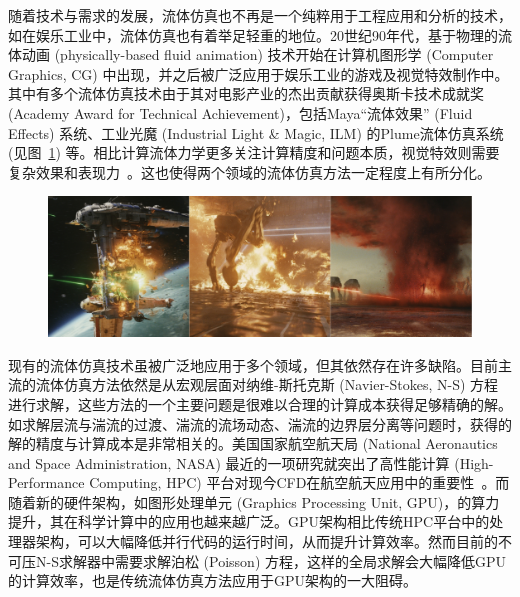 随着技术与需求的发展，流体仿真也不再是一个纯粹用于工程应用和分析的技术，如在娱乐工业中，流体仿真也有着举足轻重的地位。20世纪90年代，基于物理的流体动画 (physically-based fluid animation) 技术开始在计算机图形学 (Computer Graphics, CG) 中出现，并之后被广泛应用于娱乐工业的游戏及视觉特效制作中。其中有多个流体仿真技术由于其对电影产业的杰出贡献获得奥斯卡技术成就奖 (Academy Award for Technical Achievement)，包括Maya“流体效果” (Fluid Effects) 系统、工业光魔 (Industrial Light \& Magic, ILM) 的Plume流体仿真系统 (见图~\ref{img:star_wars}) 等。相比计算流体力学更多关注计算精度和问题本质，视觉特效则需要复杂效果和表现力~\citep{C1}。这也使得两个领域的流体仿真方法一定程度上有所分化。

\begin{figure}[htbp]
  \centering
    \includegraphics[width=0.99\columnwidth]{figures/star_wars.png}
  \label{img:star_wars}
\end{figure}

现有的流体仿真技术虽被广泛地应用于多个领域，但其依然存在许多缺陷。目前主流的流体仿真方法依然是从宏观层面对纳维-斯托克斯 (Navier-Stokes, N-S) 方程进行求解，这些方法的一个主要问题是很难以合理的计算成本获得足够精确的解。如求解层流与湍流的过渡、湍流的流场动态、湍流的边界层分离等问题时，获得的解的精度与计算成本是非常相关的。美国国家航空航天局 (National Aeronautics and Space Administration, NASA) 最近的一项研究就突出了高性能计算 (High-Performance Computing, HPC) 平台对现今CFD在航空航天应用中的重要性~\citep{slotnick2014cfd}。而随着新的硬件架构，如图形处理单元 (Graphics Processing Unit, GPU)，的算力提升，其在科学计算中的应用也越来越广泛。GPU架构相比传统HPC平台中的处理器架构，可以大幅降低并行代码的运行时间，从而提升计算效率。然而目前的不可压N-S求解器中需要求解泊松 (Poisson) 方程，这样的全局求解会大幅降低GPU的计算效率，也是传统流体仿真方法应用于GPU架构的一大阻碍。

